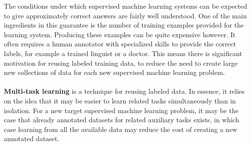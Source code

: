 The conditions under which supervised machine learning systems can be expected to give approximately correct answers are fairly well understood. One of the main ingredients in this guarantee is the number of training examples provided for the learning system. Producing these examples can be quite expensive however. It often requires a human annotator with specialized skills to provide the correct labels, for example a trained linguist or a doctor. This means there is significant motivation for reusing labeled training data, to reduce the need to create large new collections of data for each new supervised machine learning problem.
\\\\
\textbf{Multi-task learning} is a technique for reusing labeled data. In essence, it relies on the idea that it may be easier to learn related tasks simultaneously than in isolation. For a new target supervised machine learning problem, it may be the case that already annotated datasets for related auxiliary tasks exists, in which case learning from all the available data may reduce the cost of creating a new annotated dataset.